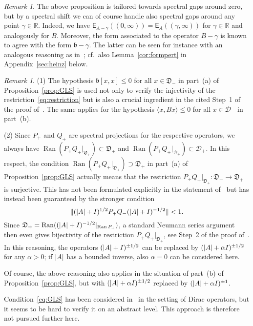 \documentclass[11pt,a4paper]{amsart}
\numberwithin{equation}{section}
\DeclareMathOperator{\Ran}{Ran}
\DeclarePairedDelimiter{\abs}{|}{|}
\DeclarePairedDelimiter{\norm}{\lVert}{\rVert}
\newcommand{\RR}{\mathbb{R}}
\newcommand{\EE}{\mathsf{E}}
\newcommand{\cD}{{\mathcal D}}
\newcommand{\fb}{{\mathfrak b}}
\newcommand{\fD}{{\mathfrak D}}
\theoremstyle{plain}
\theoremstyle{definition}
\theoremstyle{remark}
\newtheorem{remark}[theorem]{Remark}
\begin{document}
\begin{remark}\label{rem:spectralShift}
  The above proposition is tailored towards spectral gaps around zero, but by a spectral shift we can of course handle also
  spectral gaps around any point $\gamma \in \RR$. Indeed, we have $\EE_{A-\gamma}((0,\infty)) = \EE_A((\gamma,\infty))$ for
  $\gamma \in \RR$ and analogously for $B$. Moreover, the form associated to the operator $B - \gamma$ is known to agree with the
  form $\fb - \gamma$. The latter can be seen for instance with an analogous reasoning as
  in~\cite[Proposition~10.5\,(a)]{Schm12}; cf.~also Lemma~\ref{cor:formpert} in Appendix~\ref{sec:heinz} below.
\end{remark}

\begin{remark}\label{rem:neg}
  (1)
  The hypothesis $\fb[x,x]\le0$ for all $x\in\fD_-$ in part~(a) of Proposition~\ref{prop:GLS} is used not only to verify the
  injectivity of the restriction~\eqref{eq:restriction} but is also a crucial ingredient in the cited Step~1 of the proof
  of~\cite[Theorem~1]{GLS99}. The same applies for the hypothesis $\langle x,Bx \rangle\le 0$ for all $x\in\cD_-$ in part~(b).

  (2)
  Since $P_+$ and $Q_+$ are spectral projections for the respective operators, we always have
  $\Ran(P_+Q_+|_{\fD_+}) \subset \fD_+$ and $\Ran(P_+Q_+|_{\cD_+}) \subset \cD_+$. In this respect, the
  condition $\Ran(P_+Q_+|_{\fD_+}) \supset \fD_+$ in part~(a) of Proposition~\ref{prop:GLS} actually means that the restriction
  $P_+Q_+|_{\fD_+} \colon \fD_+ \to \fD_+$ is surjective. This has not been formulated explicitly in the statement
  of~\cite[Theorem~1]{GLS99} but has instead been guaranteed by the stronger condition
  \begin{equation}\label{eq:GLS}
    \norm{(\abs{A}+I)^{1/2}P_+Q_-(\abs{A}+I)^{-1/2}} < 1.
  \end{equation}
  Since $\fD_+ = \Ran ((\abs{A}+I)^{-1/2}|_{\Ran P_+})$, a standard Neumann series argument then even gives bijectivity of the
  restriction $P_+Q_+|_{\fD_+}$, see Step~2 of the proof of~\cite[Theorem~1]{GLS99}. In this reasoning, the operators
  $(\abs{A}+I)^{\pm 1/2}$ can be replaced by $(\abs{A}+\alpha I)^{\pm 1/2}$ for any $\alpha>0$; if $\abs{A}$ has a bounded
  inverse, also $\alpha=0$ can be considered here.
  
  Of course, the above reasoning also applies in the situation of part~(b) of Proposition~\ref{prop:GLS}, but with
  $(\abs{A}+\alpha I)^{\pm 1/2}$ replaced by $(\abs{A}+\alpha I)^{\pm 1}$.

  Condition~\eqref{eq:GLS} has been considered in~\cite{GLS99} in the setting of Dirac operators, but it seems to be hard to
  verify it on an abstract level. This approach is therefore not pursued further here.
\end{remark}
\end{document}
